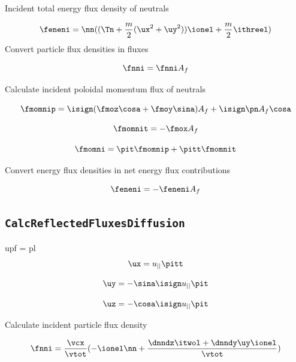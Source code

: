 Incident total energy flux density of neutrals

\begin{equation}
    \feneni = \nn (( \Tn + \frac{m}{2} (\ux^2 + \uy^2)) \ionel + \frac{m}{2} \ithreel)
\end{equation}
Convert particle flux densities in fluxes

\begin{equation}
    \fnni =  \fnni A_f
\end{equation}

Calculate incident poloidal momentum flux of neutrals

\begin{equation}
    \fmomnip =  \isign (\fmoz \cosa + \fmoy \sina ) A_f + \isign \pn A_f \cosa
\end{equation}

\begin{equation}
    \fmomnit = - \fmox A_f
\end{equation}

\begin{equation}
    \fmomni = \pit \fmomnip + \pitt \fmomnit
\end{equation}

Convert energy flux densities in net energy flux contributions

\begin{equation}
    \feneni = -\feneni A_f
\end{equation}

\subsection{\texttt{CalcReflectedFluxesDiffusion}}

      upf = pl%
\begin{equation}
    \ux = u_{||} \pitt
\end{equation}

\begin{equation}
    \uy = - \sina \isign u_{||} \pit
\end{equation}

\begin{equation}
    \uz = -\cosa \isign  u_{||} \pit
\end{equation}


Calculate incident particle flux density

\begin{equation}
    \fnni = \frac{\vcx}{\vtot} (- \ionel \nn + \frac{\dnndz \itwol + \dnndy \uy \ionel}{\vtot})
\end{equation}


